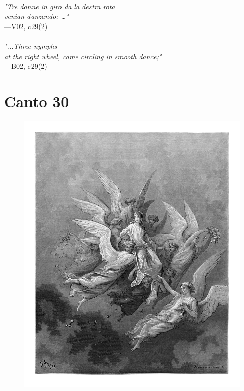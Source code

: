 \documentclass[../Dore_vision.tex]{subfiles}
\begin{document}
\begin{center}
\begin{minipage}{0.8\linewidth}
\textit{\\
"Tre donne in giro da la destra rota\\venian danzando; …"} \\
—V02, c29(2) \\~\\
\textit{"...Three nymphs\\at the right wheel, came circling in smooth dance;"} \\
—B02, c29(2)
\end{minipage}
\end{center}

\newpage

\section{Canto 30}

\begin{figure}[ht]
\centering
\includegraphics[height=\figsize]{illustrations/book_2/V02, c30.jpg}
\end{figure}
\end{document}
